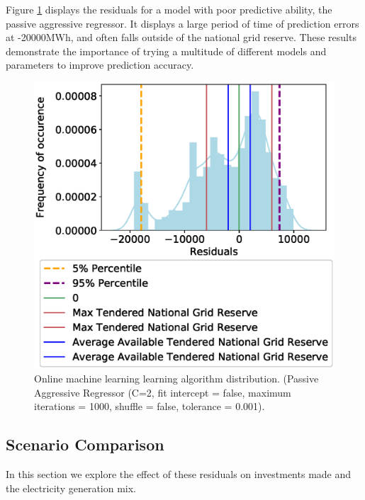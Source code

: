 \documentclass[final,3p,times,twocolumn,numbers]{elsarticle}
\begin{document}
Figure \ref{fig:bad_online_learning_day_distribution} displays the residuals for a model with poor predictive ability, the passive aggressive regressor. It displays a large period of time of prediction errors at -20000MWh, and often falls outside of the national grid reserve. These results demonstrate the importance of trying a multitude of different models and parameters to improve prediction accuracy.

\begin{figure}
\centering
\includegraphics[width=\columnwidth,natwidth=500,natheight=500]{figures/results/online_learning_dists-PA-regressor-C-2-fit_intercept-false-max_iter-1000-shuffle-false-tol-0.001.eps}
\caption{Online machine learning learning algorithm distribution. (Passive Aggressive Regressor (C=2, fit intercept = false, maximum iterations = 1000, shuffle = false, tolerance = 0.001).}
\label{fig:bad_online_learning_day_distribution}
\end{figure}




\subsection{Scenario Comparison}

In this section we explore the effect of these residuals on investments made and the electricity generation mix.
\end{document}
